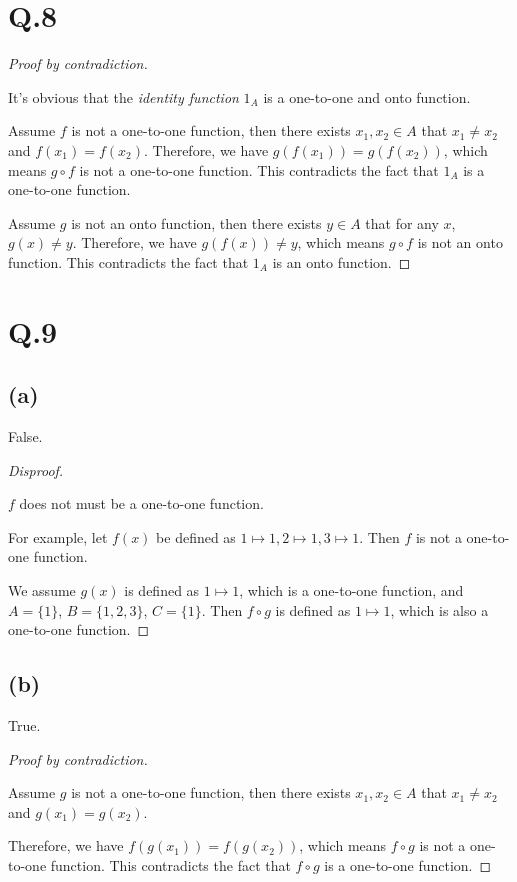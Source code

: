 \documentclass[a4paper,12pt]{article}
\begin{document}
\section*{Q.8}
\begin{proof}[Proof by contradiction]
$ $

It's obvious that the \textit{identity function} $1_A$ is a one-to-one and onto function.

Assume $f$ is not a one-to-one function, then there exists $x_1, x_2 \in A$ that $x_1 \ne x_2$ and $f(x_1) = f(x_2)$.
Therefore, we have $g(f(x_1)) = g(f(x_2))$, which means $g \circ f$ is not a one-to-one function.
This contradicts the fact that $1_A$ is a one-to-one function.

Assume $g$ is not an onto function, then there exists $y \in A$ that for any $x$, $g(x) \ne y$.
Therefore, we have $g(f(x)) \ne y$, which means $g \circ f$ is not an onto function.
This contradicts the fact that $1_A$ is an onto function.
\end{proof}

\section*{Q.9}

\subsection*{(a)}

False.

\begin{proof}[Disproof]
$ $

$f$ does not must be a one-to-one function.

For example, let $f(x)$ be defined as $1 \mapsto 1, 2 \mapsto 1, 3 \mapsto 1$.
Then $f$ is not a one-to-one function.

We assume $g(x)$ is defined as $1 \mapsto 1$, which is a one-to-one function, and $A = \{1\}$, $B = \{1,2,3\}$, $C = \{1\}$.
Then $f \circ g$ is defined as $1 \mapsto 1$, which is also a one-to-one function.
\end{proof}

\subsection*{(b)}

True.

\begin{proof}[Proof by contradiction]
$ $

Assume $g$ is not a one-to-one function, then there exists $x_1, x_2 \in A$ that $x_1 \ne x_2$ and $g(x_1) = g(x_2)$.

Therefore, we have $f(g(x_1)) = f(g(x_2))$, which means $f \circ g$ is not a one-to-one function.
This contradicts the fact that $f \circ g$ is a one-to-one function.
\end{proof}
\end{document}
